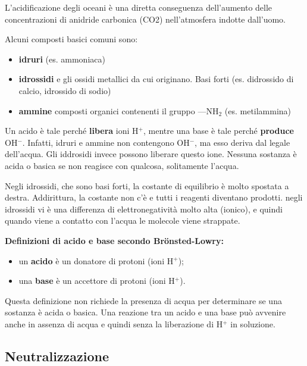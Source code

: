 \documentclass[a4paper]{article}
\begin{document}
L'acidificazione degli oceani è una diretta conseguenza dell'aumento delle concentrazioni di anidride carbonica (CO2) nell'atmosfera indotte dall'uomo.

Alcuni composti basici comuni sono:
\begin{itemize}
    \item \textbf{idruri} (es. ammoniaca)
    \item \textbf{idrossidi} e gli ossidi metallici da cui originano. Basi forti (es. didrossido di calcio, idrossido di sodio)
    \item \textbf{ammine} composti organici contenenti il gruppo —NH\({}_2\) (es. metilammina)
\end{itemize}

Un acido è tale perché \textbf{libera} ioni H\({}^+\),
mentre una base è tale perché \textbf{produce} OH\({}^-\).
Infatti, idruri e ammine non contengono OH\({}^-\), ma esso deriva dal legale dell'acqua.
Gli iddrosidi invece possono liberare questo ione.
Nessuna sostanza è acida o basica se non reagisce con qualcosa, solitamente l'acqua.

Negli idrossidi, che sono basi forti, la costante di equilibrio è molto spostata a destra.
Addirittura, la costante non c'è e tutti i reagenti diventano prodotti.
negli idrossidi vi è una differenza di elettronegatività molto alta (ionico),
e quindi quando viene a contatto con l'acqua le molecole viene strappate.

\textbf{Definizioni di acido e base secondo Brönsted-Lowry:}
\begin{itemize}
    \item un \textbf{acido} è un donatore di protoni (ioni H\({}^+\));
    \item una \textbf{base} è un accettore di protoni (ioni H\({}^+\)).
\end{itemize}
Questa definizione non richiede la presenza di acqua per determinare se una sostanza
è acida o basica.
Una reazione tra un acido e una base può avvenire anche
in assenza di acqua e quindi senza la liberazione di H\({}^+\) in
soluzione.

\subsection{Neutralizzazione}

\end{document}
